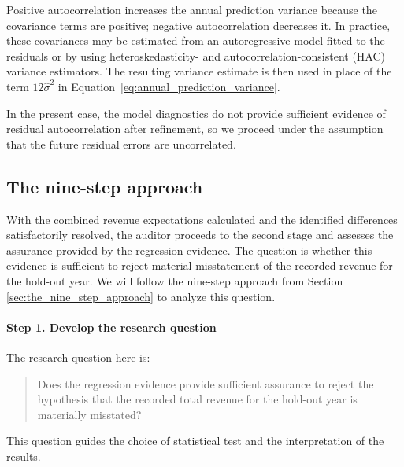 Positive autocorrelation increases the annual prediction variance because the covariance terms are positive; negative autocorrelation decreases it. In practice, these covariances may be estimated from an autoregressive model fitted to the residuals or by using heteroskedasticity- and autocorrelation-consistent (HAC) variance estimators. The resulting variance estimate is then used in place of the term \(12\hat{\sigma}^2\) in Equation~\ref{eq:annual_prediction_variance}.

In the present case, the model diagnostics do not provide sufficient evidence of residual autocorrelation after refinement, so we proceed under the assumption that the future residual errors are uncorrelated.


\subsection{The nine-step approach} %
\label{sub:the_nine_step_approach}

With the combined revenue expectations calculated and the identified differences satisfactorily resolved, the auditor proceeds to the second stage and assesses the assurance provided by the regression evidence. The question is whether this evidence is sufficient to reject material misstatement of the recorded revenue for the hold-out year.
We will follow the nine-step approach from Section \ref{sec:the_nine_step_approach} to analyze this question.

\paragraph{Step 1. Develop the research question}
The research question here is: 
\begin{quote}
Does the regression evidence provide sufficient assurance to reject the hypothesis that the recorded total revenue for the hold-out year is materially misstated?
\end{quote}
This question guides the choice of statistical test and the interpretation of the results.

